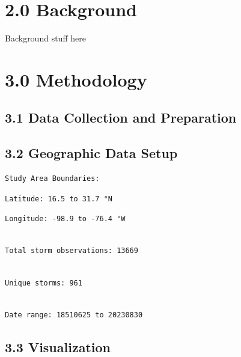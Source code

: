 \documentclass[12pt,letterpaper]{article}
\begin{document}
\section{2.0 Background}\label{background}

Background stuff here

\section{3.0 Methodology}\label{methodology}

\subsection{3.1 Data Collection and
Preparation}\label{data-collection-and-preparation}

\subsection{3.2 Geographic Data Setup}\label{geographic-data-setup}

\begin{verbatim}
Study Area Boundaries:
\end{verbatim}

\begin{verbatim}
Latitude: 16.5 to 31.7 °N
\end{verbatim}

\begin{verbatim}
Longitude: -98.9 to -76.4 °W
\end{verbatim}

\begin{verbatim}

Total storm observations: 13669
\end{verbatim}

\begin{verbatim}

Unique storms: 961
\end{verbatim}

\begin{verbatim}

Date range: 18510625 to 20230830
\end{verbatim}

\subsection{3.3 Visualization}\label{visualization}
\end{document}
